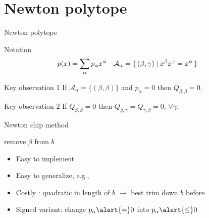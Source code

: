\documentclass{beamer}
\begin{document}
\section{Newton polytope}

\begin{frame}{Newton polytope}
    \begin{block}{Notation}
        \begin{align*}
            p(x) & = \sum_{\alpha} p_\alpha x^\alpha &
            \mathcal{A}_\alpha &= \{\, (\beta, \gamma) \mid x^\beta x^\gamma = x^\alpha \,\}
        \end{align*}
    \end{block}
    \begin{block}{Key observation 1}
        If $\mathcal{A}_\alpha = \{(\beta,\beta)\}$ and $p_\alpha = 0$ then $Q_{\beta,\beta} = 0$.
    \end{block}
    \begin{block}{Key observation 2}
        If $Q_{\beta,\beta} = 0$ then $Q_{\beta,\gamma} = Q_{\gamma,\beta} = 0$, $\forall \gamma$.
    \end{block}
\end{frame}



\begin{frame}{Newton chip method}
    \begin{algorithmic}
        \STATE remove $\beta$ from $b$
      \ENDWHILE
    \end{algorithmic}
    \begin{itemize}
      \item Easy to implement
      \item Easy to generalize, e.g., \autocite[Section~2.3]{burgdorf2016optimization}
      \item Costly : \alert{quadratic} in length of $b$ $\to$ best trim down $b$ before
      \item \alert{Signed} variant: change $p_\alpha \alert{=} 0$ into $p_\alpha \alert{\le} 0$
    \end{itemize}
\end{frame}
\end{document}
